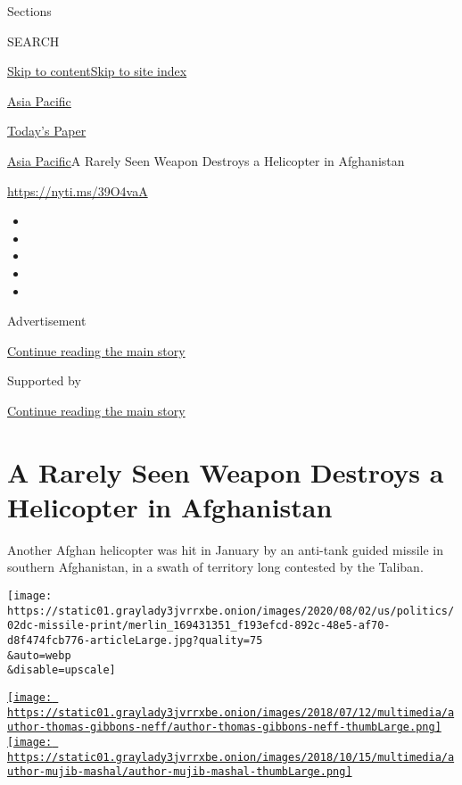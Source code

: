 Sections

SEARCH

\protect\hyperlink{site-content}{Skip to
content}\protect\hyperlink{site-index}{Skip to site index}

\href{https://www.nytimes3xbfgragh.onion/section/world/asia}{Asia
Pacific}

\href{https://myaccount.nytimes3xbfgragh.onion/auth/login?response_type=cookie\&client_id=vi}{}

\href{https://www.nytimes3xbfgragh.onion/section/todayspaper}{Today's
Paper}

\href{/section/world/asia}{Asia Pacific}\textbar{}A Rarely Seen Weapon
Destroys a Helicopter in Afghanistan

\url{https://nyti.ms/39O4vaA}

\begin{itemize}
\item
\item
\item
\item
\item
\end{itemize}

Advertisement

\protect\hyperlink{after-top}{Continue reading the main story}

Supported by

\protect\hyperlink{after-sponsor}{Continue reading the main story}

\hypertarget{a-rarely-seen-weapon-destroys-a-helicopter-in-afghanistan}{%
\section{A Rarely Seen Weapon Destroys a Helicopter in
Afghanistan}\label{a-rarely-seen-weapon-destroys-a-helicopter-in-afghanistan}}

Another Afghan helicopter was hit in January by an anti-tank guided
missile in southern Afghanistan, in a swath of territory long contested
by the Taliban.

\texttt{[image: https://static01.graylady3jvrrxbe.onion/images/2020/08/02/us/politics/02dc-missile-print/merlin\_169431351\_f193efcd-892c-48e5-af70-d8f474fcb776-articleLarge.jpg?quality=75\\\&auto=webp\\\&disable=upscale]}

\href{https://www.nytimes3xbfgragh.onion/by/thomas-gibbons-neff}{\texttt{[image: https://static01.graylady3jvrrxbe.onion/images/2018/07/12/multimedia/author-thomas-gibbons-neff/author-thomas-gibbons-neff-thumbLarge.png]}}\href{https://www.nytimes3xbfgragh.onion/by/mujib-mashal}{\texttt{[image: https://static01.graylady3jvrrxbe.onion/images/2018/10/15/multimedia/author-mujib-mashal/author-mujib-mashal-thumbLarge.png]}}

